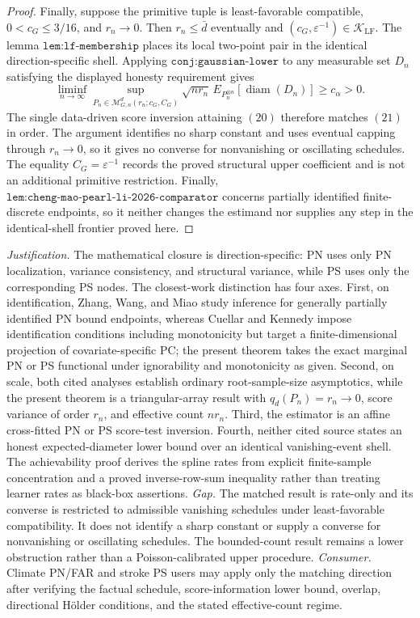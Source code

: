 \documentclass{article}
\begin{document}
\begin{proof}
Finally, suppose the primitive tuple is least-favorable compatible, \(0<c_G\le3/16\), and \(r_n\to0\). Then \(r_n\le\bar d\) eventually and \((c_G,\varepsilon^{-1})\in\mathcal K_{\mathrm{LF}}\). The lemma \(\texttt{lem:lf-membership}\) places its local two-point pair in the identical direction-specific shell. Applying \(\texttt{conj:gaussian-lower}\) to any measurable set \(D_n\) satisfying the displayed honesty requirement gives
\[\liminf_{n\to\infty}\sup_{P_n\in\mathcal M_{G,n}^d(r_n;c_G,C_G)}\sqrt{nr_n}\,E_{P_n^{\otimes n}}[\operatorname{diam}(D_n)]\ge c_\alpha>0.\tag{21}\]
The single data-driven score inversion attaining \((20)\) therefore matches \((21)\) in order. The argument identifies no sharp constant and uses eventual capping through \(r_n\to0\), so it gives no converse for nonvanishing or oscillating schedules. The equality \(C_G=\varepsilon^{-1}\) records the proved structural upper coefficient and is not an additional primitive restriction. Finally, \(\texttt{lem:cheng-mao-pearl-li-2026-comparator}\) concerns partially identified finite-discrete endpoints, so it neither changes the estimand nor supplies any step in the identical-shell frontier proved here.
\end{proof}
\par\smallskip\noindent \textit{Justification.} The mathematical closure is direction-specific: PN uses only PN localization, variance consistency, and structural variance, while PS uses only the corresponding PS nodes. The closest-work distinction has four axes. First, on identification, Zhang, Wang, and Miao \cite{ZhangWangMiao2025} study inference for generally partially identified PN bound endpoints, whereas Cuellar and Kennedy \cite{CuellarKennedy2020} impose identification conditions including monotonicity but target a finite-dimensional projection of covariate-specific PC; the present theorem takes the exact marginal PN or PS functional under ignorability and monotonicity as given. Second, on scale, both cited analyses establish ordinary root-sample-size asymptotics, while the present theorem is a triangular-array result with \(q_d(P_n)=r_n\to0\), score variance of order \(r_n\), and effective count \(nr_n\). Third, the estimator is an affine cross-fitted PN or PS score-test inversion. Fourth, neither cited source states an honest expected-diameter lower bound over an identical vanishing-event shell. The achievability proof derives the spline rates from explicit finite-sample concentration and a proved inverse-row-sum inequality rather than treating learner rates as black-box assertions. \textit{Gap.} The matched result is rate-only and its converse is restricted to admissible vanishing schedules under least-favorable compatibility. It does not identify a sharp constant or supply a converse for nonvanishing or oscillating schedules. The bounded-count result remains a lower obstruction rather than a Poisson-calibrated upper procedure. \textit{Consumer.} Climate PN/FAR and stroke PS users may apply only the matching direction after verifying the factual schedule, score-information lower bound, overlap, directional H\"older conditions, and the stated effective-count regime.
\end{document}
